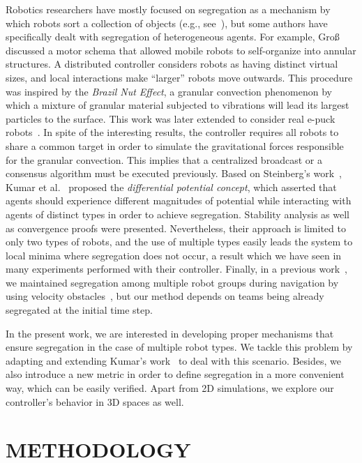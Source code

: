 \documentclass[letterpaper, 10 pt, conference]{ieeeconf}  %
\begin{document}
Robotics researchers have mostly focused on segregation as a mechanism
by which robots sort a collection of objects (e.g.,
see~\cite{Deneubourg:91}), but some authors have specifically dealt
with segregation of heterogeneous agents. For example,
Gro\ss~\cite{Gross:09} discussed a motor schema that allowed mobile
robots to self-organize into annular structures. A distributed
controller considers robots as having distinct virtual sizes, and
local interactions make ``larger'' robots move outwards. This
procedure was inspired by the \textit{Brazil Nut Effect}, a granular
convection phenomenon by which a mixture of granular material
subjected to vibrations will lead its largest particles to the
surface. This work was later extended to consider real e-puck
robots~\cite{Chen:12}. In spite of the interesting results, the
controller requires all robots to share a common target in order to
simulate the gravitational forces responsible for the granular
convection. This implies that a centralized broadcast or a consensus
algorithm must be executed previously. Based on Steinberg's
work~\cite{Steinberg:63}, Kumar et al.~\cite{Kumar:10} proposed the
\textit{differential potential concept}, which asserted that agents
should experience different magnitudes of potential while interacting
with agents of distinct types in order to achieve
segregation. Stability analysis as well as convergence proofs were
presented. Nevertheless, their approach is limited to only two types
of robots, and the use of multiple types easily leads the system to
local minima where segregation does not occur, a result which we have
seen in many experiments performed with their controller. Finally, in
a previous work~\cite{Santos:12}, we maintained segregation among
multiple robot groups during navigation by using velocity
obstacles~\cite{Fiorini:98}, but our method depends on teams being
already segregated at the initial time step.

In the present work, we are interested in developing proper mechanisms
that ensure segregation in the case of multiple robot types. We tackle
this problem by adapting and extending Kumar's work~\cite{Kumar:10} to
deal with this scenario. Besides, we also introduce a new metric in
order to define segregation in a more convenient way, which can be
easily verified. Apart from 2D simulations, we explore our
controller's behavior in 3D spaces as well.

\section{METHODOLOGY}
\label{sec:methodology}
\end{document}
